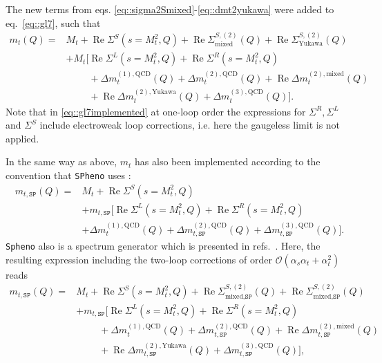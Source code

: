 \documentclass[a4paper,12pt]{book}
\begin{document}
The new terms from eqs. \eqref{eq::sigma2Smixed}-\eqref{eq::dmt2yukawa} were added to eq.\ \eqref{eq::gl7}, such that
\begin{align}
\nonumber
  m_t(Q) ={}& M_t + \operatorname{Re}\Sigma^S(s=M_t^2,Q)+ \operatorname{Re}\Sigma_\text{mixed}^{S,(2)}(Q)+ \operatorname{Re}\Sigma_\text{Yukawa}^{S,(2)}(Q)\\
  \nonumber
  &+ M_t \Big[\operatorname{Re}\Sigma^L(s=M_t^2,Q)+\operatorname{Re}\Sigma^R(s=M_t^2,Q)\\
  \nonumber
  &\phantom{+ M_t \Big[}+ \Delta m_t^{(1),\text{QCD}}(Q)+ \Delta m_t^{(2),\text{QCD}}(Q)+ \operatorname{Re}\Delta m_t^{(2),\text{mixed}}(Q)\\
  &\phantom{+ M_t \Big[}+ \operatorname{Re}\Delta m_t^{(2),\text{Yukawa}}(Q) + \Delta m_t^{(3),\text{QCD}}(Q)\Big].
\label{eq::gl7implemented}
\end{align}
Note that in \eqref{eq::gl7implemented} at one-loop order the expressions for $\Sigma^R,\Sigma^L$ and $\Sigma^S$ include electroweak loop corrections, i.e. here the gaugeless limit is not applied.\par
In the same way as above, $m_t$ has also been implemented according to the convention that \texttt{SPheno} uses \cite{allanachvoigt,sphenoconv}:
 \begin{align}
\nonumber
m_{t,\texttt{SP}}(Q) ={}& M_t + \operatorname{Re}\Sigma^S(s=M_t^2,Q) \\
\nonumber
&+ m_{t,\texttt{SP}} \Big[ \operatorname{Re}\Sigma^L(s=M_t^2,Q) +\operatorname{Re}\Sigma^R(s=M_t^2,Q) \\
\label{eq::gl7SP}
&+ \Delta m_t^{(1),\text{QCD}}(Q) + \Delta m_{t,\texttt{SP}}^{(2),\text{QCD}}(Q) + \Delta m_{t,\texttt{SP}}^{(3),\text{QCD}}(Q) \Big].
\end{align}
\texttt{Spheno} also is a spectrum generator which is presented in refs.\ \cite{spheno1,spheno2}. Here, the resulting expression including the two-loop corrections of order $\mathcal{O}(\alpha_s\alpha_t+\alpha_t^2)$ reads
\begin{align}
\nonumber
  m_{t,\texttt{SP}}(Q) ={}& M_t + \operatorname{Re}\Sigma^S(s=M_t^2,Q)+ \operatorname{Re}\Sigma_{\text{mixed},\texttt{SP}}^{S,(2)}(Q)+ \operatorname{Re}\Sigma_{\text{mixed},\texttt{SP}}^{S,(2)}(Q)\\
  \nonumber
  &+ m_{t,\texttt{SP}} \Big[\operatorname{Re}\Sigma^L(s=M_t^2,Q)+\operatorname{Re}\Sigma^R(s=M_t^2,Q)\\
  \nonumber
  &\phantom{+ M_t \Big[}+ \Delta m_t^{(1),\text{QCD}}(Q)+ \Delta m_{t,\texttt{SP}}^{(2),\text{QCD}}(Q)+ \operatorname{Re}\Delta m_{t,\texttt{SP}}^{(2),\text{mixed}}(Q)\\
  &\phantom{+ M_t \Big[}+ \operatorname{Re}\Delta m_{t,\texttt{SP}}^{(2),\text{Yukawa}}(Q) + \Delta m_{t,\texttt{SP}}^{(3),\text{QCD}}(Q)\Big],
\label{eq::gl7implementedSP}
\end{align}
\end{document}
